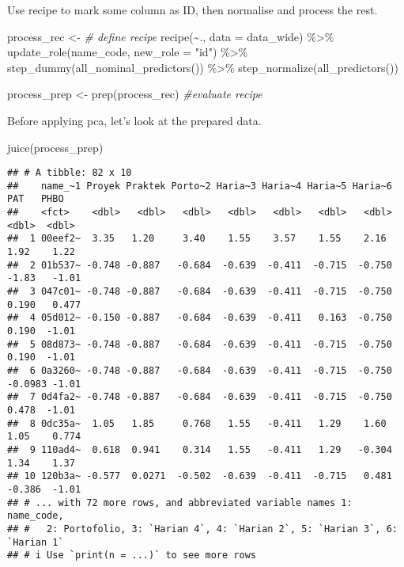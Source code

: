 \documentclass[
]{article}
\newenvironment{Shaded}{\begin{snugshade}}{\end{snugshade}}
\newcommand{\AttributeTok}[1]{\textcolor[rgb]{0.77,0.63,0.00}{#1}}
\newcommand{\CommentTok}[1]{\textcolor[rgb]{0.56,0.35,0.01}{\textit{#1}}}
\newcommand{\FunctionTok}[1]{\textcolor[rgb]{0.00,0.00,0.00}{#1}}
\newcommand{\NormalTok}[1]{#1}
\newcommand{\OtherTok}[1]{\textcolor[rgb]{0.56,0.35,0.01}{#1}}
\newcommand{\SpecialCharTok}[1]{\textcolor[rgb]{0.00,0.00,0.00}{#1}}
\newcommand{\StringTok}[1]{\textcolor[rgb]{0.31,0.60,0.02}{#1}}
\begin{document}
Use recipe to mark some column as ID, then normalise and process the
rest.

\begin{Shaded}
\begin{Highlighting}[]
\NormalTok{process\_rec }\OtherTok{\textless{}{-}} \CommentTok{\# define recipe}
  \FunctionTok{recipe}\NormalTok{(}\SpecialCharTok{\textasciitilde{}}\NormalTok{., }\AttributeTok{data =}\NormalTok{ data\_wide) }\SpecialCharTok{\%\textgreater{}\%} 
  \FunctionTok{update\_role}\NormalTok{(name\_code, }\AttributeTok{new\_role =} \StringTok{"id"}\NormalTok{) }\SpecialCharTok{\%\textgreater{}\%} 
  \FunctionTok{step\_dummy}\NormalTok{(}\FunctionTok{all\_nominal\_predictors}\NormalTok{()) }\SpecialCharTok{\%\textgreater{}\%} 
  \FunctionTok{step\_normalize}\NormalTok{(}\FunctionTok{all\_predictors}\NormalTok{()) }

\NormalTok{process\_prep }\OtherTok{\textless{}{-}} \FunctionTok{prep}\NormalTok{(process\_rec) }\CommentTok{\#evaluate recipe}
\end{Highlighting}
\end{Shaded}

Before applying pca, let's look at the prepared data.

\begin{Shaded}
\begin{Highlighting}[]
\FunctionTok{juice}\NormalTok{(process\_prep)}
\end{Highlighting}
\end{Shaded}

\begin{verbatim}
## # A tibble: 82 x 10
##    name_~1 Proyek Praktek Porto~2 Haria~3 Haria~4 Haria~5 Haria~6     PAT   PHBO
##    <fct>    <dbl>   <dbl>   <dbl>   <dbl>   <dbl>   <dbl>   <dbl>   <dbl>  <dbl>
##  1 00eef2~  3.35   1.20     3.40    1.55    3.57    1.55    2.16   1.92    1.22 
##  2 01b537~ -0.748 -0.887   -0.684  -0.639  -0.411  -0.715  -0.750 -1.83   -1.01 
##  3 047c01~ -0.748 -0.887   -0.684  -0.639  -0.411  -0.715  -0.750  0.190   0.477
##  4 05d012~ -0.150 -0.887   -0.684  -0.639  -0.411   0.163  -0.750  0.190  -1.01 
##  5 08d873~ -0.748 -0.887   -0.684  -0.639  -0.411  -0.715  -0.750  0.190  -1.01 
##  6 0a3260~ -0.748 -0.887   -0.684  -0.639  -0.411  -0.715  -0.750 -0.0983 -1.01 
##  7 0d4fa2~ -0.748 -0.887   -0.684  -0.639  -0.411  -0.715  -0.750  0.478  -1.01 
##  8 0dc35a~  1.05   1.85     0.768   1.55   -0.411   1.29    1.60   1.05    0.774
##  9 110ad4~  0.618  0.941    0.314   1.55   -0.411   1.29   -0.304  1.34    1.37 
## 10 120b3a~ -0.577  0.0271  -0.502  -0.639  -0.411  -0.715   0.481 -0.386  -1.01 
## # ... with 72 more rows, and abbreviated variable names 1: name_code,
## #   2: Portofolio, 3: `Harian 4`, 4: `Harian 2`, 5: `Harian 3`, 6: `Harian 1`
## # i Use `print(n = ...)` to see more rows
\end{verbatim}
\end{document}
